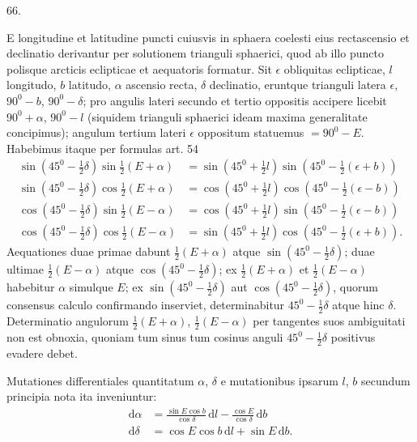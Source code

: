 \par{}\medskip
\hypertarget{native-085-article066}{}
\begin{center}66.\end{center}
E longitudine et latitudine puncti cuiusvis in sphaera coelesti eius rectascensio et declinatio derivantur per solutionem trianguli sphaerici, quod ab illo puncto polisque arcticis eclipticae et aequatoris formatur. Sit $\epsilon$ obliquitas eclipticae, $l$ longitudo, $b$ latitudo, $\alpha$ ascensio recta, $\delta$ declinatio, eruntque trianguli latera $\epsilon$, $90^0-b$, $90^0-\delta$; pro angulis lateri secundo et tertio oppositis accipere licebit $90^0+\alpha$, $90^0-l$ (siquidem trianguli sphaerici ideam maxima generalitate concipimus); angulum tertium lateri $\epsilon$ oppositum statuemus $=90^0-E$. Habebimus itaque per formulas art. 54
\[
\begin{aligned}
\sin(45^0-\tfrac12\delta)\sin\tfrac12(E+\alpha)&=\sin(45^0+\tfrac12 l)\sin(45^0-\tfrac12(\epsilon+b))\\[.5em]
\sin(45^0-\tfrac12\delta)\cos\tfrac12(E+\alpha)&=\cos(45^0+\tfrac12 l)\cos(45^0-\tfrac12(\epsilon-b))\\[.5em]
\cos(45^0-\tfrac12\delta)\sin\tfrac12(E-\alpha)&=\cos(45^0+\tfrac12 l)\sin(45^0-\tfrac12(\epsilon-b))\\[.5em]
\cos(45^0-\tfrac12\delta)\cos\tfrac12(E-\alpha)&=\sin(45^0+\tfrac12 l)\cos(45^0-\tfrac12(\epsilon+b)).
\end{aligned}
\]
\noindent Aequationes duae primae dabunt $\tfrac12(E+\alpha)$ atque $\sin(45^0-\tfrac12\delta)$; duae ultimae $\tfrac12(E-\alpha)$ atque $\cos(45^0-\tfrac12\delta)$; ex $\tfrac12(E+\alpha)$ et $\tfrac12(E-\alpha)$ habebitur $\alpha$ simulque $E$; ex $\sin(45^0-\tfrac12\delta)$ aut $\cos(45^0-\tfrac12\delta)$, quorum consensus calculo confirmando inserviet, determinabitur $45^0-\tfrac12\delta$ atque hinc $\delta$. Determinatio angulorum $\tfrac12(E+\alpha)$, $\tfrac12(E-\alpha)$ per tangentes suos ambiguitati non est obnoxia, quoniam tum sinus tum cosinus anguli $45^0-\tfrac12\delta$ positivus evadere debet.

Mutationes differentiales quantitatum $\alpha$, $\delta$ e mutationibus ipsarum $l$, $b$ secundum principia nota ita inveniuntur:
\[
\begin{aligned}
\mathrm{d}\alpha&=\frac{\sin E\cos b}{\cos\delta}\,\mathrm{d}l-\frac{\cos E}{\cos\delta}\,\mathrm{d}b\\[.6em]
\mathrm{d}\delta&=\cos E\cos b\,\mathrm{d}l+\sin E\,\mathrm{d}b.
\end{aligned}
\]
